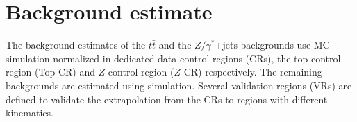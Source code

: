\begin{table}[ht]
  \caption{The number of expected signal events pasing each of the signal
    region cuts. This is shown for stop masses of 500~\GeV, 800~\GeV, and
    1000~\GeV.  The estimated yields are taken from MC simulation,
    and are normalized to 20.3~\ifb, and the uncertainty given is the
    MC statistical uncertainty. The signal models have an assumed
    branching fraction of
    $Br(\tilde{t}\rightarrow be) = Br(\tilde{t}\rightarrow b\mu) = 0.5$.
  }
  \label{tab:sr_cutflow}
\end{table}

\section{Background estimate}
\label{sec:bkg}

The background estimates of the $t\bar{t}$ and the $Z/\gamma^{*}$+jets
backgrounds use MC simulation normalized in dedicated data
control regions (CRs), the top control region (Top CR) and $Z$ control
region ($Z$ CR) respectively.  The remaining backgrounds are estimated using
simulation. Several validation regions (VRs) are
defined to validate the extrapolation from the CRs to regions with different
kinematics.

